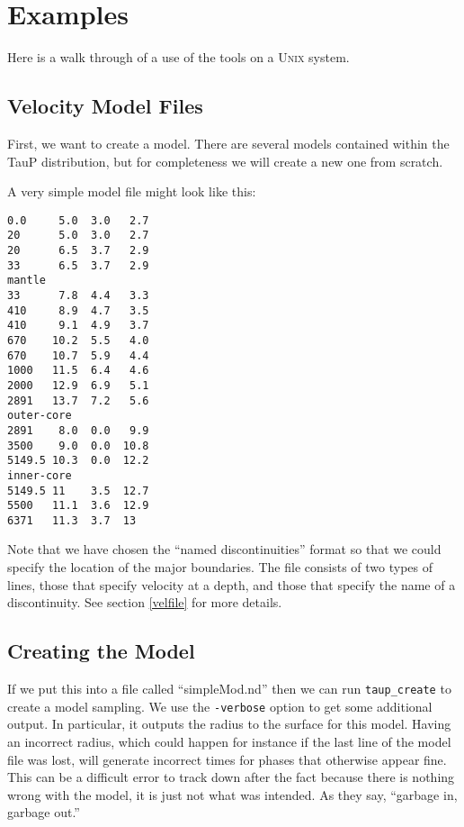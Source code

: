 
\section{Examples} \label{exampleCreate}

Here is a walk through of a use of the tools on a \textsc{Unix} system.

\subsection{Velocity Model Files} \label{exampleND}
First, we want to create a model. There are several models contained within
the TauP distribution, but for completeness we will create a new one
from scratch.

A very simple model file might look like this:

\begin{verbatim}
0.0     5.0  3.0   2.7
20      5.0  3.0   2.7
20      6.5  3.7   2.9
33      6.5  3.7   2.9
mantle
33      7.8  4.4   3.3
410     8.9  4.7   3.5
410     9.1  4.9   3.7
670    10.2  5.5   4.0
670    10.7  5.9   4.4
1000   11.5  6.4   4.6
2000   12.9  6.9   5.1
2891   13.7  7.2   5.6
outer-core
2891    8.0  0.0   9.9
3500    9.0  0.0  10.8
5149.5 10.3  0.0  12.2
inner-core
5149.5 11    3.5  12.7
5500   11.1  3.6  12.9
6371   11.3  3.7  13
\end{verbatim}

Note that we have chosen the ``named discontinuities'' format so
that we could specify the location of the major boundaries.
The file consists of two types of lines, those that specify velocity at a depth,
and those that specify the name of a discontinuity. See section \ref{velfile}
for more details.

\subsection{Creating the Model}

If we put this into a file called ``simpleMod.nd'' then we can run
\texttt{taup\_create} to create a model sampling. We use the
\texttt{-verbose} option to get some additional output. In particular,
it outputs the radius to the surface for this model. Having an incorrect
radius, which could happen for instance
if the last line of the model file was lost,
will generate incorrect times for phases that otherwise appear fine.
This can be a difficult error to track down after the fact because
there is nothing wrong with the model, it is just not what was intended.
As they say, ``garbage in, garbage out.''

